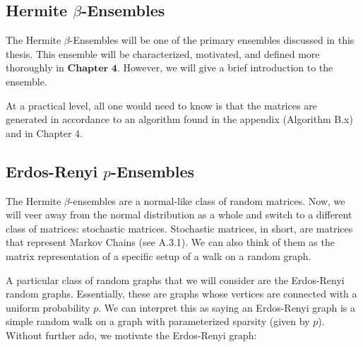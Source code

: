 % 
% 
% 
% 

\subsection{Hermite $\beta$-Ensembles}

The Hermite $\beta$-Ensembles will be one of the primary ensembles discussed in this thesis. This ensemble will be characterized, motivated, and defined more thoroughly in $\textbf{Chapter 4}$. However, we will give a brief introduction to the ensemble.

At a practical level, all one would need to know is that the matrices are generated in accordance to an algorithm found in the appendix (Algorithm B.x) and in Chapter 4. 

\subsection{Erdos-Renyi $p$-Ensembles}

The Hermite $\beta$-ensembles are a normal-like class of random matrices. Now, we will veer away from the normal distribution as a whole and switch to a different class of matrices: stochastic matrices. Stochastic matrices, in short, are matrices that represent Markov Chains (see A.3.1). We can also think of them as the matrix representation of a specific setup of a walk on a random graph. 

A particular class of random graphs that we will consider are the Erdos-Renyi random graphs. Essentially, these are graphs whose vertices are connected with a uniform probability $p$. We can interpret this as saying an Erdos-Renyi graph is a simple random walk on a graph with parameterized sparsity (given by $p$). Without further ado, we motivate the Erdos-Renyi graph:

